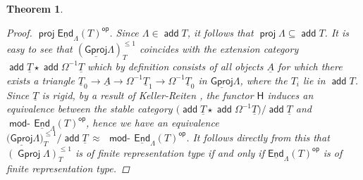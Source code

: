 \documentclass[oneside, a4paper,reqno]{amsart}
\numberwithin{equation}{section}
\newtheorem{thm}{Theorem}[section]
\theoremstyle{definition}
\begin{document}
\begin{thm}
\begin{proof}
$\operatorname*{\mathsf{proj}}\operatorname*{\underline{\mathsf{End}}}_{\Lambda}(T)^\operatorname*{\mathsf{op}}$. Since $\Lambda \in \operatorname*{\mathsf{add}} T$, it follows that $\operatorname*{\mathsf{proj}}\Lambda \subseteq \operatorname*{\mathsf{add}} T$. It is easy to see that  $({\operatorname{\underline{\mathsf{Gproj}}}\nolimits}\Lambda)^{\leq 1}_{T}$ coincides with the extension category $\operatorname*{\mathsf{add}} \underline{T} \star\operatorname*{\mathsf{add}} \Omega^{-1}\underline{T}$ which by definition consists  of all objects ${\underline A}$ for which there exists a triangle $\underline{T}_{0} {\longrightarrow} {\underline A} {\longrightarrow} \Omega^{-1}\underline{T}_{1} {\longrightarrow} \Omega^{-1}\underline{T}_{0}$ in ${\operatorname{\underline{\mathsf{Gproj}}}\nolimits}\Lambda$, where the $T_{i}$ lie in $\operatorname*{\mathsf{add}} T$.  Since $\underline{T}$ is rigid, by a result of Keller-Reiten \cite{KR}, the functor $\mathsf{H}$ induces  an equivalence between the stable category $\bigl(\operatorname*{\mathsf{add}} \underline{T} \star\operatorname*{\mathsf{add}} \Omega^{-1}\underline{T}\bigr)\big/\operatorname*{\mathsf{add}}\underline{T}$ and $\operatorname*{\mathsf{mod}-\!}\operatorname*{\underline{\mathsf{End}}}_{\Lambda}(T)^\operatorname*{\mathsf{op}}$, hence we have an equivalence $\bigl({\operatorname{\underline{\mathsf{Gproj}}}\nolimits}\Lambda)^{\leq 1}_{T} \big/\operatorname*{\mathsf{add}}\underline{T}\, \approx \,\ \operatorname*{\mathsf{mod}-\!}\operatorname*{\underline{\mathsf{End}}}_{\Lambda}(T)^\operatorname*{\mathsf{op}}$. It follows directly from this that $({\operatorname{\mathsf{Gproj}}\nolimits}\Lambda)^{\leq 1}_{T}$ is of finite representation type if and only if $\operatorname*{\underline{\mathsf{End}}}_{\Lambda}(T)^\operatorname*{\mathsf{op}}$ is of finite representation type.


\end{proof}
\end{thm}
\end{document}
